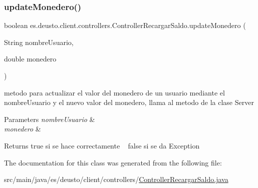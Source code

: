 \subsubsection{\texorpdfstring{updateMonedero()}{updateMonedero()}}
{\footnotesize\ttfamily boolean es.\+deusto.\+client.\+controllers.\+Controller\+Recargar\+Saldo.\+update\+Monedero (\begin{DoxyParamCaption}\item[{String}]{nombre\+Usuario,  }\item[{double}]{monedero }\end{DoxyParamCaption})}

metodo para actualizar el valor del monedero de un usuario mediante el nombre\+Usuario y el nuevo valor del monedero, llama al metodo de la clase Server 
\begin{DoxyParams}{Parameters}
{\em nombre\+Usuario} & \\
\hline
{\em monedero} & \\
\hline
\end{DoxyParams}
\begin{DoxyReturn}{Returns}
true si se hace correctamente ~\newline
 false si se da Exception 
\end{DoxyReturn}


The documentation for this class was generated from the following file\+:\begin{DoxyCompactItemize}
\item 
src/main/java/es/deusto/client/controllers/\mbox{\hyperlink{_controller_recargar_saldo_8java}{Controller\+Recargar\+Saldo.\+java}}\end{DoxyCompactItemize}
